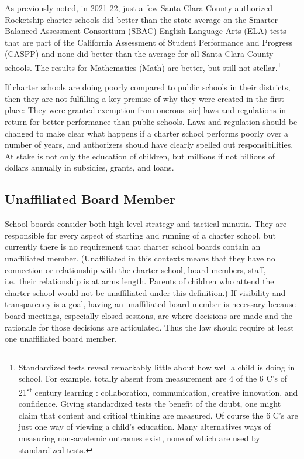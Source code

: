 As previously noted, in 2021-22, just a few Santa Clara County authorized Rocketship charter schools did better than the state average on the Smarter Balanced Assessment Consortium (SBAC) English Language Arts (ELA) tests that are part of the California Assessment of Student Performance and Progress (CASPP) and none did better than the average for all Santa Clara County schools. The results for Mathematics (Math) are better, but still not stellar.\footnote{Standardized tests reveal remarkably little about how well a child is doing in school. For example, totally absent from measurement are 4 of the 6 C's of 21\textsuperscript{st}  century learning \parencite{Hirsh-Pasek.etal2020}: collaboration, communication, creative innovation, and confidence. Giving standardized tests the benefit of the doubt, one might claim that content and critical thinking are measured. Of course the 6 C's are just one way of viewing a child's education. Many alternatives ways of measuring non-academic outcomes exist, none of which are used by standardized tests.}

If charter schools are doing poorly compared to public schools in their districts, then they are not fulfilling a key premise of why they were created in the first place: They were granted exemption from onerous [sic] laws and regulations in return for better performance than public schools. Laws and regulation should be changed to make clear what happens if a charter school performs poorly over a number of years, and authorizers should have clearly spelled out responsibilities. At stake is not only the education of children, but millions if not billions of dollars annually in subsidies, grants, and loans.

\subsection{Unaffiliated Board Member}\indent%
\label{sec:unaff-board-memb}\indent%

School boards consider both high level strategy and tactical minutia. They are responsible for every aspect of starting and running of a charter school, but currently there is no requirement that charter school boards contain an unaffiliated member. (Unaffiliated in this contexts means that they have no connection or relationship with the charter school, board members, staff, i.e.\ their relationship is at arms length. Parents of children who attend the charter school would not be unaffiliated under this definition.) If visibility and transparency is a goal, having an unaffiliated board member is necessary because board meetings, especially closed sessions, are where decisions are made and the rationale for those decisions are articulated. Thus the law should require at least one unaffiliated board member.

